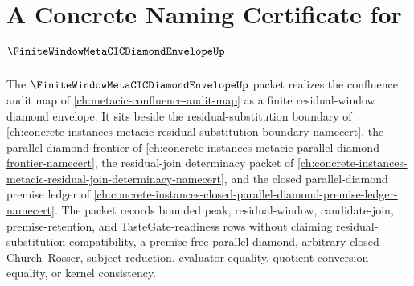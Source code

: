\chapter{A Concrete Naming Certificate for $\FiniteWindowMetaCICDiamondEnvelopeUp$}
\label{ch:concrete-instances-finite-window-metacic-diamond-envelope-namecert}

The $\FiniteWindowMetaCICDiamondEnvelopeUp$ packet realizes the confluence audit map of \autoref{ch:metacic-confluence-audit-map} as a finite residual-window diamond envelope. It sits beside the residual-substitution boundary of \autoref{ch:concrete-instances-metacic-residual-substitution-boundary-namecert}, the parallel-diamond frontier of \autoref{ch:concrete-instances-metacic-parallel-diamond-frontier-namecert}, the residual-join determinacy packet of \autoref{ch:concrete-instances-metacic-residual-join-determinacy-namecert}, and the closed parallel-diamond premise ledger of \autoref{ch:concrete-instances-closed-parallel-diamond-premise-ledger-namecert}. The packet records bounded peak, residual-window, candidate-join, premise-retention, and TasteGate-readiness rows without claiming residual-substitution compatibility, a premise-free parallel diamond, arbitrary closed Church--Rosser, subject reduction, evaluator equality, quotient conversion equality, or kernel consistency.



